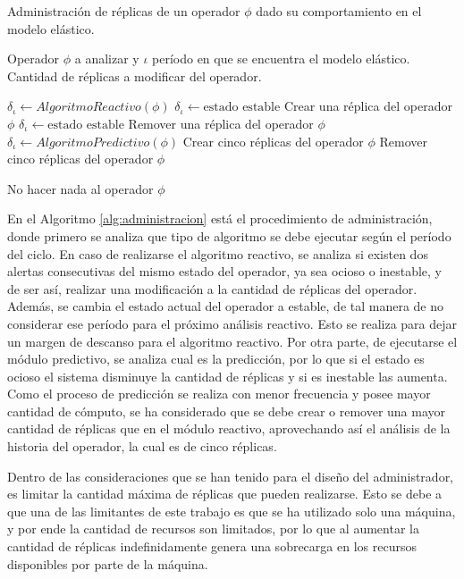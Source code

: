 \begin{algorithm}[!ht]
	\caption{Administración de réplicas de un operador $\phi$ dado su comportamiento en el modelo elástico.}
	\label{alg:administracion}
	\begin{algorithmic}[1]
	\REQUIRE Operador $\phi$ a analizar y $\iota$ período en que se encuentra el modelo elástico.
	\ENSURE Cantidad de réplicas a modificar del operador.	
	
		\STATE $\delta_{\iota} \leftarrow AlgoritmoReactivo(\phi)$
				\STATE $\delta_{\iota} \leftarrow \text{estado estable}$ 
				\RETURN Crear una réplica del operador $\phi$
			\ENDIF
			\STATE $\delta_{\iota} \leftarrow \text{estado estable}$ 
			\RETURN Remover una réplica del operador $\phi$
		\ENDIF 
	\ELSE
		\STATE $\delta_{\iota} \leftarrow AlgoritmoPredictivo(\phi)$
				\RETURN Crear cinco réplicas del operador $\phi$
			\ENDIF
			\RETURN Remover cinco réplicas del operador $\phi$
		\ENDIF
	\ENDIF
	
	\RETURN No hacer nada al operador $\phi$
	
	\end{algorithmic}
\end{algorithm}

En el Algoritmo \ref{alg:administracion} está el procedimiento de administración, donde primero se analiza que tipo de algoritmo se debe ejecutar según el período del ciclo. En caso de realizarse el algoritmo reactivo, se analiza si existen dos alertas consecutivas del mismo estado del operador, ya sea ocioso o inestable, y de ser así, realizar una modificación a la cantidad de réplicas del operador. Además, se cambia el estado actual del operador a estable, de tal manera de no considerar ese período para el próximo análisis reactivo. Esto se realiza para dejar un margen de descanso para el algoritmo reactivo. Por otra parte, de ejecutarse el módulo predictivo, se analiza cual es la predicción, por lo que si el estado es ocioso el sistema disminuye la cantidad de réplicas y si es inestable las aumenta. Como el proceso de predicción se realiza con menor frecuencia y posee mayor cantidad de cómputo, se ha considerado que se debe crear o remover una mayor cantidad de réplicas que en el módulo reactivo, aprovechando así el análisis de la historia del operador, la cual es de cinco réplicas.

Dentro de las consideraciones que se han tenido para el diseño del administrador, es limitar la cantidad máxima de réplicas que pueden realizarse. Esto se debe a que una de las limitantes de este trabajo es que se ha  utilizado solo una máquina, y por ende la cantidad de recursos son limitados, por lo que al aumentar la cantidad de réplicas indefinidamente genera una sobrecarga en los recursos disponibles por parte de la máquina.